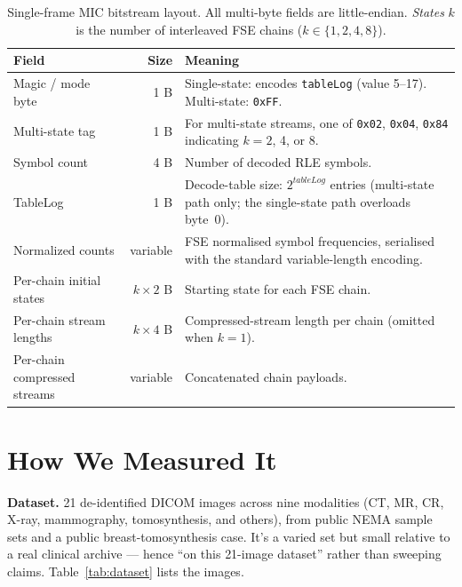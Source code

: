 \documentclass[11pt]{article}
\begin{document}
\begin{table}[htbp]
\centering
\caption{Single-frame MIC bitstream layout. All multi-byte fields are
little-endian. \emph{States} $k$ is the number of interleaved FSE chains
($k \in \{1,2,4,8\}$).}
\label{tab:format}
\footnotesize
\begin{tabular}{p{2.6cm}rp{6.0cm}}
\toprule
Field & Size & Meaning \\
\midrule
Magic / mode byte & 1 B & Single-state: encodes \texttt{tableLog} (value 5--17). Multi-state: \texttt{0xFF}. \\
Multi-state tag & 1 B & For multi-state streams, one of \texttt{0x02}, \texttt{0x04}, \texttt{0x84} indicating $k=2$, 4, or 8. \\
Symbol count & 4 B & Number of decoded RLE symbols. \\
TableLog & 1 B & Decode-table size: $2^{\textit{tableLog}}$ entries (multi-state path only; the single-state path overloads byte~0). \\
Normalized counts & variable & FSE normalised symbol frequencies, serialised with the standard variable-length encoding. \\
Per-chain initial states & $k \times 2$ B & Starting state for each FSE chain. \\
Per-chain stream lengths & $k \times 4$ B & Compressed-stream length per chain (omitted when $k=1$). \\
Per-chain compressed streams & variable & Concatenated chain payloads. \\
\bottomrule
\end{tabular}
\end{table}

\section{How We Measured It}

\textbf{Dataset.} 21 de-identified DICOM images across nine modalities (CT, MR,
CR, X-ray, mammography, tomosynthesis, and others), from public NEMA sample
sets and a public breast-tomosynthesis case. It's a varied set but small
relative to a real clinical archive --- hence ``on this 21-image dataset''
rather than sweeping claims. Table~\ref{tab:dataset} lists the images.
\end{document}
